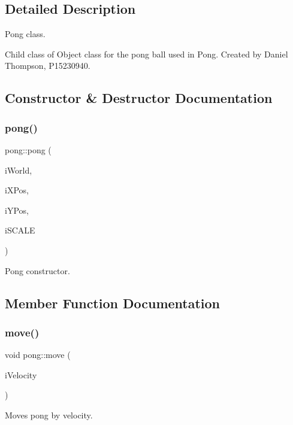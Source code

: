 \subsection{Detailed Description}
Pong class. 

Child class of Object class for the pong ball used in Pong. Created by Daniel Thompson, P15230940. 

\subsection{Constructor \& Destructor Documentation}
\mbox{\label{classpong_aba99737cd7a044d2d943501433229702}} 
\subsubsection{\texorpdfstring{pong()}{pong()}}
{\footnotesize\ttfamily pong\+::pong (\begin{DoxyParamCaption}\item[{b2\+World \&}]{i\+World,  }\item[{float}]{i\+X\+Pos,  }\item[{float}]{i\+Y\+Pos,  }\item[{double}]{i\+S\+C\+A\+LE }\end{DoxyParamCaption})}



Pong constructor. 



\subsection{Member Function Documentation}
\mbox{\label{classpong_a9b9d00c224e64244a82b4c2bcea0633b}} 
\subsubsection{\texorpdfstring{move()}{move()}}
{\footnotesize\ttfamily void pong\+::move (\begin{DoxyParamCaption}\item[{b2\+Vec2 \&}]{i\+Velocity }\end{DoxyParamCaption})}



Moves pong by velocity. 

